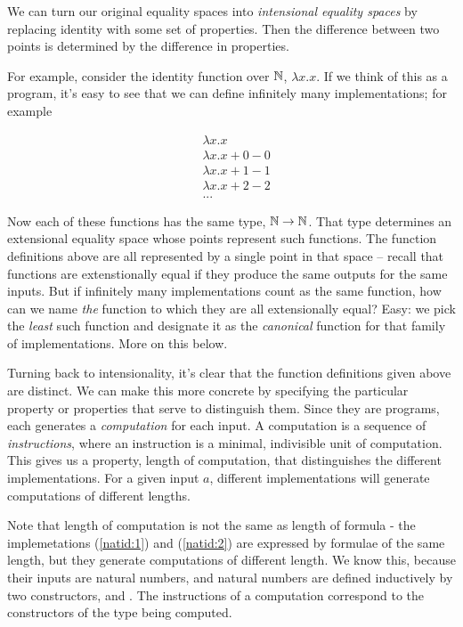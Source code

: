 \documentclass{article}
\begin{document}
We can turn our original equality spaces into \textit{intensional
  equality spaces} by replacing identity with some set of properties.
Then the difference between two points is determined by the difference
in properties.

For example, consider the identity function over \(\mathbb{N}\), \(\lambda
x.x\). If we think of this as a program, it's easy to see that we can
define infinitely many implementations; for example

\begin{align}
  & \lambda x.x \label{natid:lfp} \\
  & \lambda x.x + 0 - 0 \\
  & \lambda x.x + 1 - 1 \label{natid:1} \\
  & \lambda x.x + 2 - 2 \label{natid:2} \\
  & ... \nonumber
\end{align}

Now each of these functions has the same type, \(\mathbb{N}\rightarrow\mathbb{N}\). That
type determines an extensional equality space whose points represent
such functions. The function definitions above are all represented by
a single point in that space -- recall that functions are
extenstionally equal if they produce the same outputs for the same
inputs. But if infinitely many implementations count as the same
function, how can we name \textit{the} function to which they are all
extensionally equal? Easy: we pick the \textit{least} such function and
designate it as the \textit{canonical} function for that family of
implementations. More on this below.

Turning back to intensionality, it's clear that the function
definitions given above are distinct. We can make this more concrete
by specifying the particular property or properties that serve to
distinguish them. Since they are programs, each generates a
\textit{computation} for each input. A computation is a sequence of
\textit{instructions}, where an instruction is a minimal, indivisible
unit of computation. This gives us a property, length of computation,
that distinguishes the different implementations. For a given input
\(a\), different implementations will generate computations of
different lengths.

Note that length of computation is not the same as length of formula -
the implemetations (\ref{natid:1}) and (\ref{natid:2}) are expressed
by formulae of the same length, but they generate computations of
different length. We know this, because their inputs are natural
numbers, and natural numbers are defined inductively by two
constructors, \Znat and \Snat. The instructions of a computation
correspond to the constructors of the type being computed.
\end{document}
